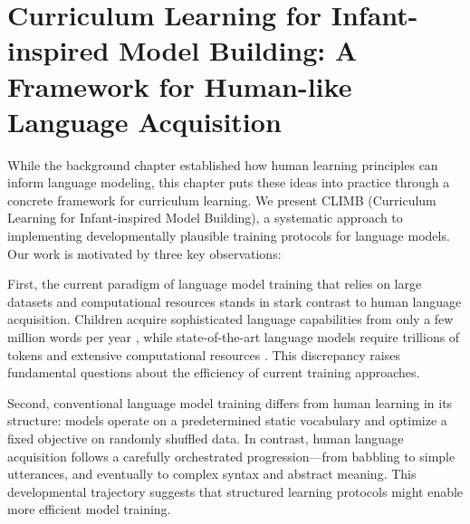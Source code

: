\chapter{Curriculum Learning for Infant-inspired Model Building: A Framework for Human-like Language Acquisition}
\label{chapter:CLIMB}





While the background chapter established how human learning principles can inform language modeling, this chapter puts these ideas into practice through a concrete framework for curriculum learning. We present CLIMB (Curriculum Learning for Infant-inspired Model Building), a systematic approach to implementing developmentally plausible training protocols for language models. Our work is motivated by three key observations:

First, the current paradigm of language model training that relies on large datasets and computational resources stands in stark contrast to human language acquisition. Children acquire sophisticated language capabilities from only a few million words per year \citep{gilkerson2017mapping}, while state-of-the-art language models require trillions of tokens and extensive computational resources \citep{zhang2021need, zhao2023llmsurvey}. This discrepancy raises fundamental questions about the efficiency of current training approaches.

Second, conventional language model training differs from human learning in its structure: models operate on a predetermined static vocabulary and optimize a fixed objective on randomly shuffled data. In contrast, human language acquisition follows a carefully orchestrated progression—from babbling to simple utterances, and eventually to complex syntax and abstract meaning. This developmental trajectory suggests that structured learning protocols might enable more efficient model training.

